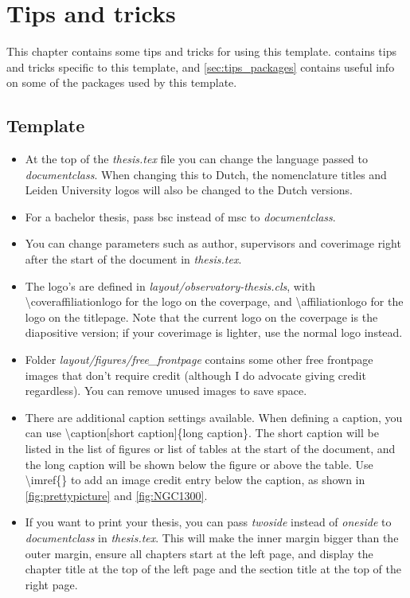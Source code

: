 
\chapter{Tips and tricks}
\label{chap:tips}
This chapter contains some tips and tricks for using this template.  contains tips and tricks specific to this template, and \cref{sec:tips_packages} contains useful info on some of the packages used by this template.
\section{Template}
\label{sec:tips_template}
\begin{itemize}
    \item At the top of the \textit{thesis.tex} file you can change the language passed to \textit{documentclass}. When changing this to Dutch, the nomenclature titles and Leiden University logos will also be changed to the Dutch versions.
    \item For a bachelor thesis, pass bsc instead of msc to \textit{documentclass}.
    \item You can change parameters such as author, supervisors and coverimage right after the start of the document in \textit{thesis.tex}.
    \item The logo's are defined in \textit{layout/observatory-thesis.cls}, with \textbackslash coveraffiliationlogo  for the logo on the coverpage, and \textbackslash affiliationlogo for the logo on the titlepage. Note that the current logo on the coverpage is the diapositive version; if your coverimage is lighter, use the normal logo instead.
    \item Folder \textit{layout/figures/free\_frontpage} contains some other free frontpage images that don't require credit (although I do advocate giving credit regardless). You can remove unused images to save space.
    \item There are additional caption settings available. When defining a caption, you can use \textbackslash caption[short caption]\{long caption\}. The short caption will be listed in the list of figures or list of tables at the start of the document, and the long caption will be shown below the figure or above the table. Use \textbackslash imref\{\} to add an image credit entry below the caption, as shown in \cref{fig:prettypicture} and \cref{fig:NGC1300}.
    \item If you want to print your thesis, you can pass \textit{twoside} instead of \textit{oneside} to \textit{documentclass} in \textit{thesis.tex}. This will make the inner margin bigger than the outer margin, ensure all chapters start at the left page, and display the chapter title at the top of the left page and the section title at the top of the right page.

\end{itemize}
